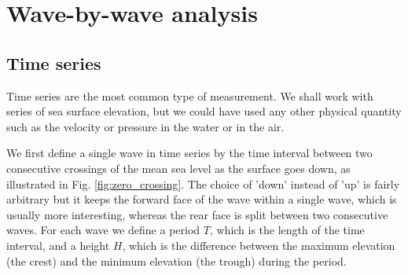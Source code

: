 \section{Wave-by-wave analysis\label{anavague}}
\subsection{Time series}
Time series are the most common type of measurement. 
We shall work with series of sea surface elevation, but we could have used any other physical quantity such as the velocity or pressure in the water or in the air. 

We first define a single wave in time series by the time interval between two consecutive 
crossings of the mean sea level as the surface goes down, as illustrated in Fig. \ref{fig:zero_crossing}. 
The choice of 'down' instead of 'up' is fairly arbitrary but it 
keeps the forward face of the wave within a single wave, which is usually  more interesting, whereas the rear face is split 
between two consecutive waves. 
For each wave we define a period $T$, which is the length of the time interval, and a height $H$, which is the 
difference between the maximum elevation (the crest) and the minimum elevation (the trough) during the period. 



